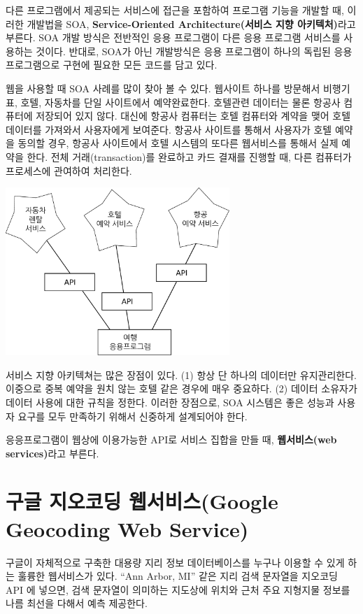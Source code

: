 다른 프로그램에서 제공되는 서비스에 접근을 포함하여 프로그램 기능을 개발할 때, 
이러한 개발법을 SOA, {\bf Service-Oriented Architecture(서비스 지향 아키텍처)}라고 부른다.
SOA 개발 방식은 전반적인 응용 프로그램이 다른 응용 프로그램 서비스를 사용하는 것이다. 
반대로, SOA가 아닌 개발방식은 응용 프로그램이 하나의 독립된 응용 프로그램으로 구현에 필요한 모든 코드를 담고 있다.

웹을 사용할 때 SOA 사례를 많이 찾아 볼 수 있다. 
웹사이트 하나를 방문해서 비행기표, 호텔, 자동차를 단일 사이트에서 예약완료한다. 
호텔관련 데이터는 물론 항공사 컴퓨터에 저장되어 있지 않다.
대신에 항공사 컴퓨터는 호텔 컴퓨터와 계약을 맺어 호텔 데이터를 가져와서 사용자에게 보여준다.
항공사 사이트를 통해서 사용자가 호텔 예약을 동의할 경우, 항공사 사이트에서 호텔 시스템의 또다른 웹서비스를 통해서 실제 예약을 한다.
전체 거래(transaction)를 완료하고 카드 결재를 진행할 때, 다른 컴퓨터가 프로세스에 관여하여 처리한다.

\beforefig
\centerline{\includegraphics[height=2.50in]{figs2/soa.eps}}
\afterfig

서비스 지향 아키텍쳐는 많은 장점이 있다. 
(1) 항상 단 하나의 데이터만 유지관리한다. 
이중으로 중복 예약을 원치 않는 호텔  같은 경우에 매우 중요하다. 
(2) 데이터 소유자가 데이터 사용에 대한 규칙을 정한다. 
이러한 장점으로, SOA 시스템은 좋은 성능과 사용자 요구를 모두 만족하기 위해서 신중하게 설계되어야 한다. 

응응프로그램이 웹상에 이용가능한 API로 서비스 집합을 만들 때, {\bf 웹서비스(web services)}라고 부른다.

\section{구글 지오코딩 웹서비스(Google Geocoding Web Service)}

구글이 자체적으로 구축한 대용량 지리 정보 데이터베이스를 누구나 이용할 수 있게 하는 훌륭한 웹서비스가 있다.
``Ann Arbor, MI'' 같은 지리 검색 문자열을 지오코딩 API 에 넣으면, 
검색 문자열이 의미하는 지도상에 위치와 근처 주요 지형지물 정보를 나름 최선을 다해서 예측 제공한다.  

